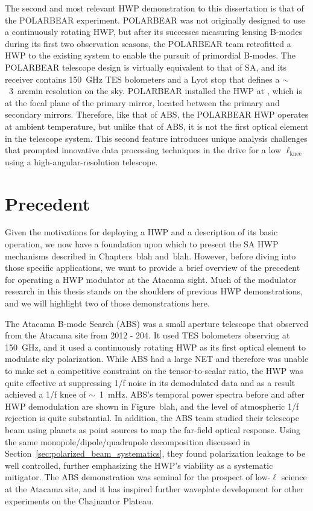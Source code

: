 The second and most relevant HWP demonstration to this dissertation is that of the POLARBEAR experiment. POLARBEAR was not originally designed to use a continuously rotating HWP, but after its successes measuring lensing B-modes during its first two observation seasons, the POLARBEAR team retrofitted a HWP to the existing system to enable the pursuit of primordial B-modes. The POLARBEAR telescope design is virtually equivalent to that of SA, and its receiver contains 150~GHz TES bolometers and a Lyot stop that defines a $\sim$~3~arcmin resolution on the sky. POLARBEAR installed the HWP at , which is at the focal plane of the primary mirror, located between the primary and secondary mirrors. Therefore, like that of ABS, the POLARBEAR HWP operates at ambient temperature, but unlike that of ABS, it is not the first optical element in the telescope system. This second feature introduces unique analysis challenges that prompted innovative data processing techniques in the drive for a low $\ell_{\mathrm{knee}}$ using a high-angular-resolution telescope.


\section{Precedent}
\label{sec:hwp_precedent}

Given the motivations for deploying a HWP and a description of its basic operation, we now have a foundation upon which to present the SA HWP mechanisms described in Chapters~blah and~blah. However, before diving into those specific applications, we want to provide a brief overview of the precedent for operating a HWP modulator at the Atacama sight. Much of the modulator research in this thesis stands on the shoulders of previous HWP demonstrations, and we will highlight two of those demonstrations here.

The Atacama B-mode Search (ABS) was a small aperture telescope that observed from the Atacama site from 2012 - 204. It used TES bolometers observing at 150~GHz, and it used a continuously rotating HWP as its first optical element to modulate sky polarization. While ABS had a large NET and therefore was unable to make set a competitive constraint on the tensor-to-scalar ratio, the HWP was quite effective at suppressing 1/f noise in its demodulated data and as a result achieved a 1/f knee  of $\sim$~1~mHz. ABS's temporal power spectra before and after HWP demodulation are shown in Figure~blah, and the level of atmospheric 1/f rejection is quite substantial. In addition, the ABS team studied their telescope beam using planets as point sources to map the far-field optical response. Using the same monopole/dipole/quadrupole decomposition discussed in Section~\ref{sec:polarized_beam_systematics}, they found polarization leakage to be well controlled, further emphasizing the HWP's viability as a systematic mitigator. The ABS demonstration was seminal for the prospect of low-$\ell$ science at the Atacama site, and it has inspired further waveplate development for other experiments on the Chajnantor Plateau.